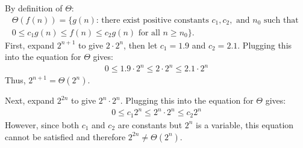 By definition of $\Theta$:
\begin{eqnarray*}
	\Theta(f(n)) = \{g(n) \text{: there exist positive constants } c_1, c_2, \text{ and } n_0 \text{ such that } \\
	0 \leq c_1 g(n) \leq f(n) \leq c_2 g(n) \text{ for all } n \geq n_0\}.
\end{eqnarray*}
First, expand $2^{n+1}$ to give $2 \cdot 2^n$, then let $c_1 = 1.9$ and $c_2 = 2.1$. Plugging this into the equation for $\Theta$ gives:
\begin{eqnarray*}
	0 \leq 1.9 \cdot 2^n \leq 2 \cdot 2^n \leq 2.1 \cdot 2^n
\end{eqnarray*}
Thus, $2^{n+1} = \Theta(2^n)$.

Next, expand $2^{2n}$ to give $2^n \cdot 2^n$. Plugging this into the equation for $\Theta$ gives:
\begin{eqnarray*}
	0 \leq c_1 2^n \leq 2^n \cdot 2^n \leq c_2 2^n
\end{eqnarray*}
However, since both $c_1$ and $c_2$ are constants but $2^n$ is a variable, this equation cannot be satisfied and therefore $2^{2n} \neq \Theta(2^n)$.
